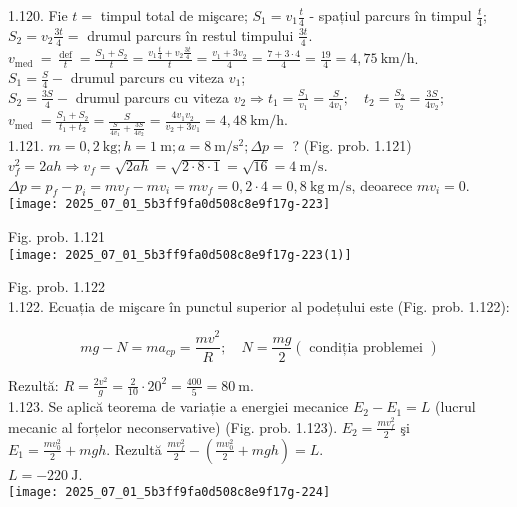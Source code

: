 1.120. Fie $t=$ timpul total de mişcare; $S_{1}=v_{1} \frac{t}{4}$ - spațiul parcurs în timpul $\frac{t}{4}$; $S_{2}=v_{2} \frac{3 t}{4}=$ drumul parcurs în restul timpului $\frac{3 t}{4}$.\\
$v_{\text {med }}=\frac{\operatorname{def}}{t}=\frac{S_{1}+S_{2}}{t}=\frac{v_{1} \frac{t}{4}+v_{2} \frac{3 t}{4}}{t}=\frac{v_{1}+3 v_{2}}{4}=\frac{7+3 \cdot 4}{4}=\frac{19}{4}=4,75 \mathrm{~km} / \mathrm{h}$.\\
$S_{1}=\frac{S}{4}-$ drumul parcurs cu viteza $v_{1}$;\\
$S_{2}=\frac{3 S}{4}-$ drumul parcurs cu viteza $v_{2} \Rightarrow t_{1}=\frac{S_{1}}{v_{1}}=\frac{S}{4 v_{1}} ; \quad t_{2}=\frac{S_{2}}{v_{2}}=\frac{3 S}{4 v_{2}} ;$\\
$v_{\text {med }}=\frac{S_{1}+S_{2}}{t_{1}+t_{2}}=\frac{S}{\frac{S}{4 v_{1}}+\frac{3 S}{4 v_{2}}}=\frac{4 v_{1} v_{2}}{v_{2}+3 v_{1}}=4,48 \mathrm{~km} / \mathrm{h}$.\\
1.121. $m=0,2 \mathrm{~kg} ; h=1 \mathrm{~m} ; a=8 \mathrm{~m} / \mathrm{s}^{2} ; \Delta p=$ ? (Fig. prob. 1.121)\\
$v_{f}^{2}=2 a h \Rightarrow v_{f}=\sqrt{2 a h}=\sqrt{2 \cdot 8 \cdot 1}=\sqrt{16}=4 \mathrm{~m} / \mathrm{s}$.\\
$\Delta p=p_{f}-p_{i}=m v_{f}-m v_{i}=m v_{f}=0,2 \cdot 4=0,8 \mathrm{~kg} \mathrm{~m} / \mathrm{s}$, deoarece $m v_{i}=0$.\\
\texttt{[image: 2025\_07\_01\_5b3ff9fa0d508c8e9f17g-223]}

Fig. prob. 1.121\\
\texttt{[image: 2025\_07\_01\_5b3ff9fa0d508c8e9f17g-223(1)]}

Fig. prob. 1.122\\
1.122. Ecuația de mişcare în punctul superior al podețului este (Fig. prob. 1.122):

$$
m g-N=m a_{c p}=\frac{m v^{2}}{R} ; \quad N=\frac{m g}{2}(\text { condiția problemei })
$$

Rezultă: $R=\frac{2 v^{2}}{g}=\frac{2}{10} \cdot 20^{2}=\frac{400}{5}=80 \mathrm{~m}$.\\
1.123. Se aplică teorema de variație a energiei mecanice $E_{2}-E_{1}=L$ (lucrul mecanic al forțelor neconservative) (Fig. prob. 1.123). $E_{2}=\frac{m v_{f}^{2}}{2}$ şi $E_{1}=\frac{m v_{0}^{2}}{2}+m g h$. Rezultă $\frac{m v_{f}^{2}}{2}-\left(\frac{m v_{0}^{2}}{2}+m g h\right)=L$.\\
$L=-220 \mathrm{~J}$.\\
\texttt{[image: 2025\_07\_01\_5b3ff9fa0d508c8e9f17g-224]}

